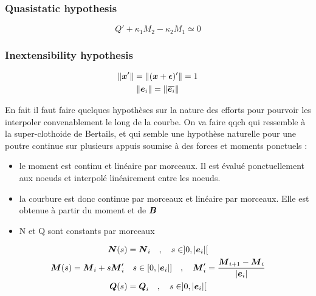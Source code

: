 \subsubsection{Quasistatic hypothesis}
\begin{equation}
	Q' + \kappa_1 M_2 - \kappa_2 M_1 \simeq 0
\end{equation}
\subsubsection{Inextensibility hypothesis}
\begin{subequations}
	\begin{gather}
	\|\vect{x}'\| = \|(\vect{x} + \vect{\epsilon})'\| = 1 \\
	\|\vect{e}_i\| = \|\overbar{\vect{e}_i}\|
	\end{gather}
\end{subequations}

En fait il faut faire quelques hypothèses sur la nature des efforts pour pourvoir les interpoler convenablement le long de la courbe. On va faire qqch qui ressemble à la super-clothoide de Bertails, et qui semble une hypothèse naturelle pour une poutre continue sur plusieurs appuis soumise à des forces et moments ponctuels :
\begin{itemize}
\item le moment est continu et linéaire par morceaux. Il est évalué ponctuellement aux noeuds et interpolé linéairement entre les noeuds.
\item la courbure est donc continue par morceaux et linéaire par morceaux. Elle est obtenue à partir du moment et de $\boldsymbol{B}$
\item N et Q sont constants par morceaux
\end{itemize}
\begin{subequations}
	\begin{gather}
		\boldsymbol{N}(s) = \boldsymbol{N}_{i}  \quad , \quad s \in ]0,|\boldsymbol{e}_i|[ \\
		\boldsymbol{M}(s) = \boldsymbol{M}_{i} + s \boldsymbol{M}'_{i} \quad s \in [0,|\boldsymbol{e}_i|]
		\quad , \quad \boldsymbol{M}'_{i}= \frac{\boldsymbol{M}_{i+1} - \boldsymbol{M}_{i}}{|\boldsymbol{e}_i|} \\
		\boldsymbol{Q}(s) = \boldsymbol{Q}_{i}  \quad , \quad s \in ]0,|\boldsymbol{e}_i|[
	\end{gather}
\end{subequations}

